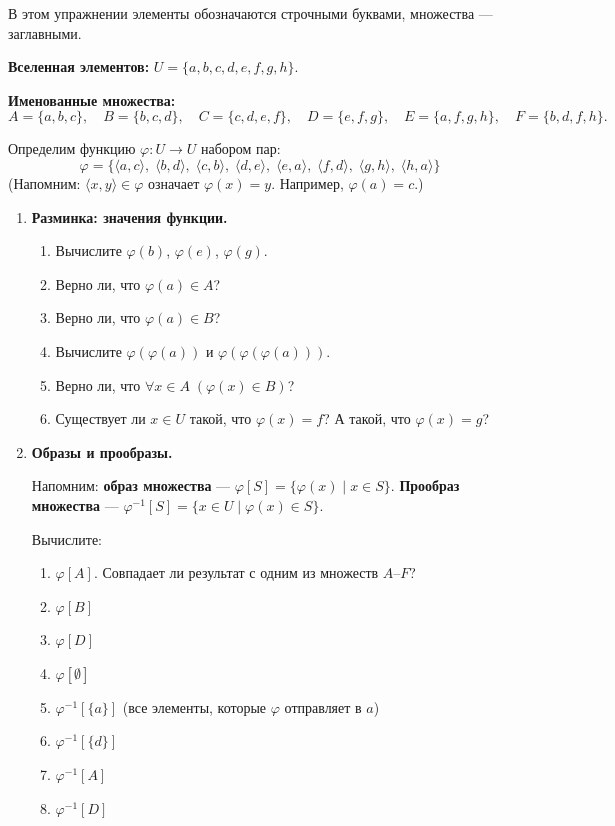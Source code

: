 \documentclass[11pt, a4paper]{extarticle}
\newcommand{\ph}{\varphi}
\begin{document}
\begin{exercise}\;

В этом упражнении элементы обозначаются строчными буквами, множества --- заглавными.

\textbf{Вселенная элементов:} $U = \{a, b, c, d, e, f, g, h\}$.

\textbf{Именованные множества:}
$$A = \{a, b, c\}, \quad B = \{b, c, d\}, \quad C = \{c, d, e, f\}, \quad D = \{e, f, g\}, \quad E = \{a, f, g, h\}, \quad F = \{b, d, f, h\}.$$

Определим функцию $\ph: U \to U$ набором пар:
$$\ph = \{\langle a,c \rangle,\; \langle b,d \rangle,\; \langle c,b \rangle,\; \langle d,e \rangle,\; \langle e,a \rangle,\; \langle f,d \rangle,\; \langle g,h \rangle,\; \langle h,a \rangle\}$$
(Напомним: $\langle x,y \rangle \in \ph$ означает $\ph(x) = y$. Например, $\ph(a) = c$.)

\begin{enumerate}
\item \textbf{Разминка: значения функции.}
\begin{enumerate}[label=(\roman*)]
    \item Вычислите $\ph(b)$, $\ph(e)$, $\ph(g)$.
    \item Верно ли, что $\ph(a) \in A$?
    \item Верно ли, что $\ph(a) \in B$?
    \item Вычислите $\ph(\ph(a))$ и $\ph(\ph(\ph(a)))$.
    \item Верно ли, что $\forall x \in A\; (\ph(x) \in B)$?
    \item Существует ли $x \in U$ такой, что $\ph(x) = f$? А такой, что $\ph(x) = g$?
\end{enumerate}

\item \textbf{Образы и прообразы.}

Напомним: \textbf{образ множества} --- $\ph[S] = \{\ph(x) \mid x \in S\}$.
\textbf{Прообраз множества} --- $\ph^{-1}[S] = \{x \in U \mid \ph(x) \in S\}$.

Вычислите:
\begin{enumerate}[label=(\roman*), start=7]
    \item $\ph[A]$. Совпадает ли результат с одним из множеств $A$--$F$?
    \item $\ph[B]$
    \item $\ph[D]$
    \item $\ph[\emptyset]$
    \item $\ph^{-1}[\{a\}]$ \quad (все элементы, которые $\ph$ отправляет в $a$)
    \item $\ph^{-1}[\{d\}]$
    \item $\ph^{-1}[A]$
    \item $\ph^{-1}[D]$
\end{enumerate}


\end{enumerate}
\end{exercise}
\end{document}
